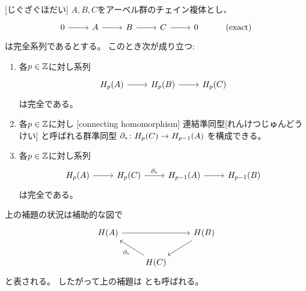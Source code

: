 \documentclass[report]{jlreq}
\begin{document}
\begin{lemma}[ジグザグ補題]
    [じぐざぐほだい]
    $A, B, C$をアーベル群のチェイン複体とし、
    \begin{equation}
        \begin{tikzcd}
            0 \ar{r}
                & A \ar{r}
                & B \ar{r}
                & C \ar{r}
                & 0
                & (\text{exact})
        \end{tikzcd}
    \end{equation}
    は完全系列であるとする。
    このとき次が成り立つ:
    \begin{enumerate}
        \item 各$p \in \mathbb{Z}$に対し系列
            \begin{equation}
                \begin{tikzcd}
                    H_p(A) \ar{r}
                        & H_p(B) \ar{r}
                        & H_p(C)
                \end{tikzcd}
            \end{equation}
            は完全である。
        \item 各$p \in \mathbb{Z}$に対し
            [connecting homomorphism]
            {連結準同型}[れんけつじゅんどうけい]
            と呼ばれる群準同型
            $\partial_* \colon H_p(C) \to H_{p-1}(A)$
            を構成できる。
        \item 各$p \in \mathbb{Z}$に対し系列
            \begin{equation}
                \begin{tikzcd}
                    H_p(A) \ar{r}
                        & H_p(C) \ar{r}{\del_*}
                        & H_{p-1}(A) \ar{r}
                        & H_{p-1}(B)
                \end{tikzcd}
            \end{equation}
            は完全である。
    \end{enumerate}
\end{lemma}

\begin{remark}
    上の補題の状況は補助的な図で
    \begin{equation}
        \begin{tikzcd}
            H(A) \ar{rr}
                && H(B) \ar{ld} \\
            & H(C) \ar{lu}{\del_*}
        \end{tikzcd}
    \end{equation}
    と表される。
    したがって上の補題は
    とも呼ばれる。
\end{remark}
\end{document}
